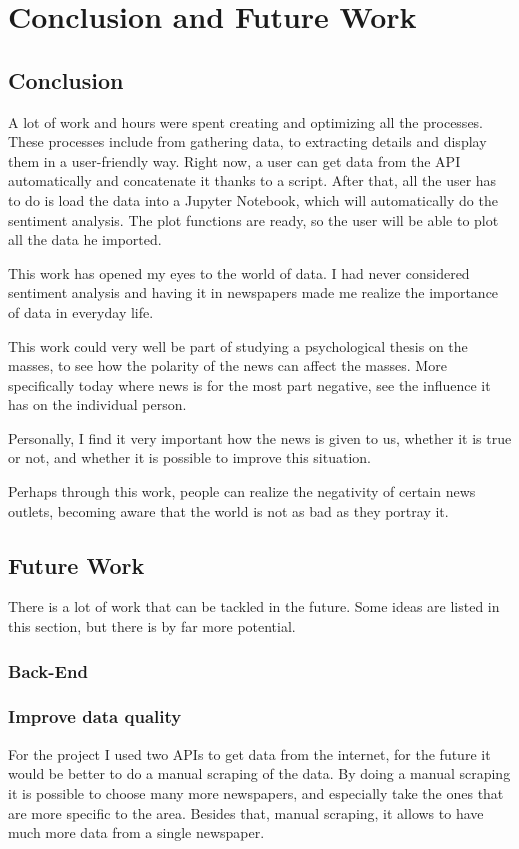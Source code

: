 \section{Conclusion and Future Work}

\subsection{Conclusion}
A lot of work and hours were spent creating and optimizing all the processes.  These processes include from gathering data, to extracting details and display them in a user-friendly way.
Right now, a user can get data from the API automatically and concatenate it thanks to a script.
After that, all the user has to do is load the data into a Jupyter Notebook, which will automatically do the sentiment analysis.
The plot functions are ready, so the user will be able to plot all the data he imported.

This work has opened my eyes to the world of data. I had never considered sentiment analysis and having it in newspapers made me realize the importance of data in everyday life.

This work could very well be part of studying a psychological thesis on the masses, to see how the polarity of the news can affect the masses.
More specifically today where news is for the most part negative, see the influence it has on the individual person.

Personally, I find it very important how the news is given to us, whether it is true or not, and whether it is possible to improve this situation.

Perhaps through this work, people can realize the negativity of certain news outlets, becoming aware that the world is not as bad as they portray it.

\subsection{Future Work}
There is a lot of work that can be tackled in the future. Some ideas are listed in this section, but there is by far more potential.

\subsubsection{Back-End}
\subsubsection*{Improve data quality}
For the project I used two APIs to get data from the internet, for the future it would be better to do a manual scraping of the data.
By doing a manual scraping it is possible to choose many more newspapers, and especially take the ones that are more specific to the area.
Besides that, manual scraping, it allows to have much more data from a single newspaper.

